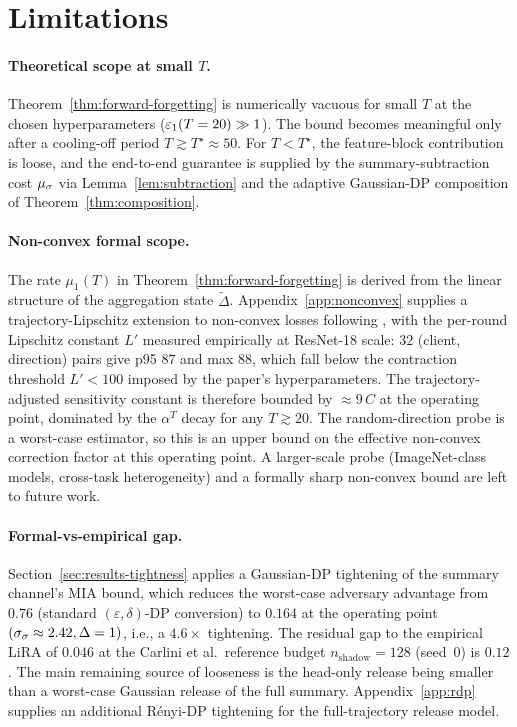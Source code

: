 \section{Limitations}
\label{sec:limitations}

\paragraph{Theoretical scope at small $T$.}
Theorem~\ref{thm:forward-forgetting} is numerically vacuous for small $T$ at the
chosen hyperparameters ($\varepsilon_1(T=20) \gg 1$). The bound becomes meaningful only
after a cooling-off period $T \gtrsim T^\star \approx 50$. For $T < T^\star$, the
feature-block contribution is loose, and the end-to-end guarantee is supplied by the
summary-subtraction cost $\mu_\sigma$ via Lemma~\ref{lem:subtraction} and the
adaptive Gaussian-DP composition of Theorem~\ref{thm:composition}.

\paragraph{Non-convex formal scope.}
The rate $\mu_1(T)$ in Theorem~\ref{thm:forward-forgetting} is derived from the
linear structure of the aggregation state $\tilde\Delta$.
Appendix~\ref{app:nonconvex} supplies a trajectory-Lipschitz extension to
non-convex losses following \cite{gupta2021adaptive}, with the per-round Lipschitz
constant $L'$ measured empirically at ResNet-18 scale: $32$ (client, direction)
pairs give p95 $87$ and max $88$, which fall below the contraction threshold
$L' < 100$ imposed by the paper's hyperparameters. The trajectory-adjusted
sensitivity constant is therefore bounded by $\approx 9\,C$ at the operating
point, dominated by the $\alpha^T$ decay for any $T \gtrsim 20$. The random-direction
probe is a worst-case estimator, so this is an upper bound on the effective
non-convex correction factor at this operating point. A larger-scale probe
(ImageNet-class models, cross-task heterogeneity) and a formally sharp
non-convex bound are left to future work.

\paragraph{Formal-vs-empirical gap.}
Section~\ref{sec:results-tightness} applies a Gaussian-DP tightening of the
summary channel's MIA bound, which reduces the worst-case adversary advantage from
$0.76$ (standard $(\varepsilon, \delta)$-DP conversion) to $0.164$ at the operating
point $(\sigma_\sigma \approx 2.42, \Delta = 1)$, i.e., a $4.6\times$ tightening.
The residual gap to the empirical LiRA of $0.046$ at the Carlini et al.\ reference
budget $n_\mathrm{shadow}{=}128$ (seed~0) is $0.12$. The main remaining source of
looseness is the head-only release being smaller than a worst-case Gaussian release
of the full summary. Appendix~\ref{app:rdp} supplies an additional R\'enyi-DP
tightening for the full-trajectory release model.

